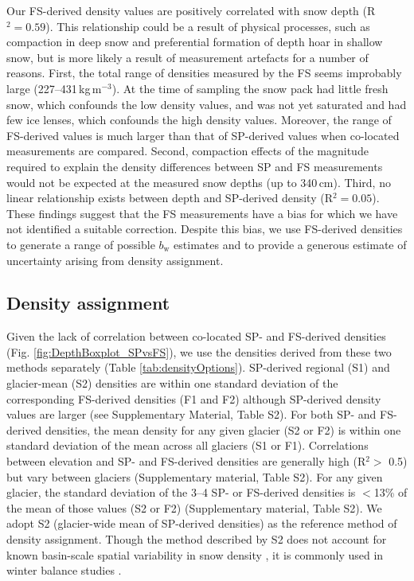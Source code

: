 \documentclass[twocolumn, letterpaper]{igs}
\begin{document}
Our FS-derived density values are positively correlated with snow depth (R$^2= 0.59$). This relationship could be a result of physical processes, such as compaction in deep snow and preferential formation of depth hoar in shallow snow, but is more likely a result of measurement artefacts for a number of reasons. First, the total range of densities measured by the FS seems improbably large (227--431\,kg\,m$^{-3}$). At the time of sampling the snow pack had little fresh snow, which confounds the low density values, and was not yet saturated and had few ice lenses, which confounds the high density values. Moreover, the range of FS-derived values is much larger than that of SP-derived values when co-located measurements are compared. Second, compaction effects of the magnitude required to explain the density differences between SP and FS measurements would not be expected at the measured snow depths (up to 340\,cm). Third, no linear relationship exists between depth and SP-derived density (R$^2 = 0.05$). These findings suggest that the FS measurements have a bias for which we have not identified a suitable correction. Despite this bias, we use FS-derived densities to generate a range of possible $b_\mathrm{w}$ estimates and to provide a generous estimate of uncertainty arising from density assignment.

\subsection{Density assignment}

Given the lack of correlation between co-located SP- and FS-derived densities (Fig. \ref{fig:DepthBoxplot_SPvsFS}), we use the densities derived from these two methods separately (Table \ref{tab:densityOptions}). SP-derived regional (S1) and glacier-mean (S2) densities are within one standard deviation of the corresponding FS-derived densities (F1 and F2) although SP-derived density values are larger (see Supplementary Material, Table S2). For both SP- and FS-derived densities, the mean density for any given glacier (S2 or F2) is within one standard deviation of the mean across all glaciers (S1 or F1). Correlations between elevation and SP- and FS-derived densities are generally high (R$^2>$ 0.5) but vary between glaciers (Supplementary material, Table S2). For any given glacier, the standard deviation of the 3--4 SP- or FS-derived densities is $<$13\% of the mean of those values (S2 or F2) (Supplementary material, Table S2). We adopt S2 (glacier-wide mean of SP-derived densities) as the reference method of density assignment. Though the method described by S2 does not account for known basin-scale spatial variability in snow density \citep[e.g.][]{Wetlaufer2016}, it is commonly used in winter balance studies \citep[e.g.][]{Elder1991,McGrath2015,Cullen2017}. 
\end{document}
